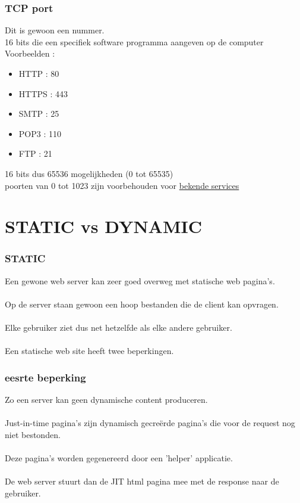 \documentclass{beamer}
\begin{document}
\begin{frame}

\frametitle{TCP port}

{\Large Dit is gewoon een nummer.\\

16 bits die een specifiek software programma aangeven op de computer\\

Voorbeelden :

\begin{itemize}
  \item HTTP : 80
  \item HTTPS : 443
  \item SMTP : 25
  \item POP3 : 110
  \item FTP : 21
\end{itemize}}

16 bits dus 65536 mogelijkheden (0 tot 65535)\\
poorten van 0 tot 1023 zijn voorbehouden voor \href{https://en.wikipedia.org/wiki/List_of_TCP_and_UDP_port_numbers\#Well-known_ports}{bekende services}

\end{frame}

\section{STATIC vs DYNAMIC}


\begin{frame}

\frametitle{STATIC}

{\Large Een gewone web server kan zeer goed overweg met statische web pagina's.\\~\\
Op de server staan gewoon een hoop bestanden die de client kan opvragen.\\~\\
Elke gebruiker ziet dus net hetzelfde als elke andere gebruiker.\\~\\
Een statische web site heeft twee beperkingen.}

\end{frame}


\begin{frame}

\frametitle{eesrte beperking}

{\Large Zo een server kan geen dynamische content produceren.\\~\\
Just-in-time pagina's zijn dynamisch gecre\"erde pagina's die
voor de request nog niet bestonden.\\~\\Deze pagina's worden gegenereerd
door een 'helper' applicatie.\\~\\ De web server stuurt dan de JIT html pagina
mee met de response naar de gebruiker.}

\end{frame}
\end{document}
